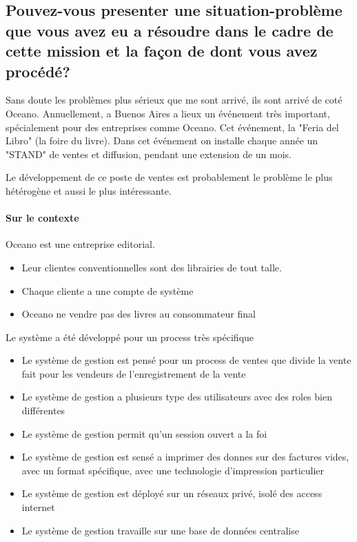 \documentclass{resume} %
\begin{document}
	\subsection{Pouvez-vous presenter une situation-problème que vous avez eu a résoudre dans le cadre de cette mission et la façon de dont vous avez procédé?}

		Sans doute les problèmes plus sérieux que me sont arrivé, ils sont arrivé de coté Oceano. 
		Annuellement, a Buenos Aires a lieux un événement très important, spécialement pour des entreprises comme Oceano. Cet événement, la "Feria del Libro" (la foire du livre). 
		Dans cet événement on installe chaque année un "STAND" de ventes et diffusion, pendant une extension de un mois. 

		Le développement de ce poste de ventes est probablement le problème le plus hétérogène et aussi le plus intéressante. 

		\paragraph{ Sur le contexte } 

		Oceano est une entreprise editorial. 

		\begin {itemize} 
		 \item Leur clientes conventionnelles sont des librairies de tout talle.
		 \item Chaque cliente a une compte de système
		 \item Oceano ne vendre pas des livres au consommateur final
		 \end{itemize} 

		Le système a été développé pour un process très spécifique 
		 \begin{itemize}  
		   \item Le système de gestion est pensé pour un process de ventes que divide la vente fait pour les vendeurs de l'enregistrement de la vente
		   \item Le système de gestion a plusieurs type des utilisateurs avec des roles bien différentes
		   \item Le système de gestion permit qu'un session ouvert a la foi 
		   \item Le système de gestion est sensé a imprimer des donnes sur des factures vides, avec un format spécifique, avec une technologie d'impression particulier
		   \item Le système de gestion est déployé sur un réseaux privé, isolé des access internet
		   \item Le système de gestion travaille sur une base de données centralise
		 \end{itemize}  
\end{document}
